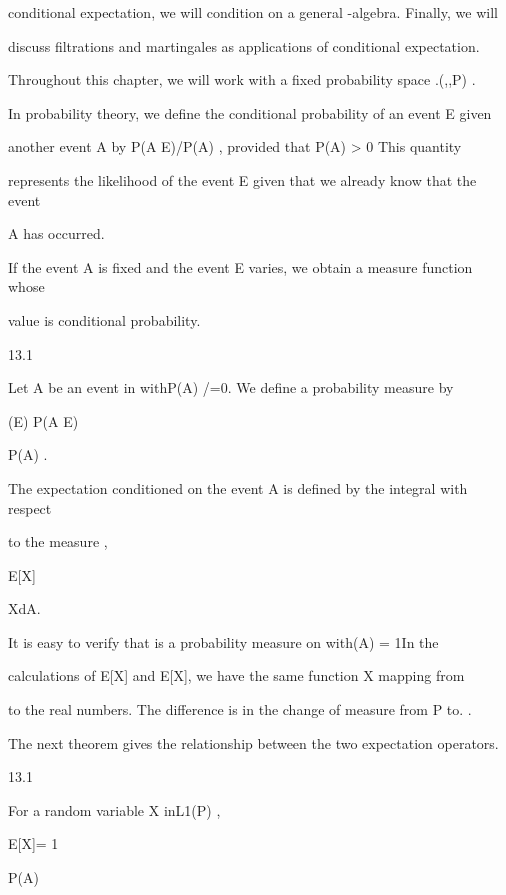 conditional expectation, we will condition on a general \sigma-algebra. Finally, we will

discuss filtrations and martingales as applications of conditional expectation.

Throughout this chapter, we will work with a fixed probability space .(\Omega,,P) .

In probability theory, we define the conditional probability of an event E given

another event A by P(A \cap E)/P(A) , provided that P(A) > 0 This quantity

represents the likelihood of the event E given that we already know that the event

A has occurred.

If the event A is fixed and the event E varies, we obtain a measure function whose

value is conditional probability.

\begin{defbox}{13.1}
\end{defbox}

Let A be an event in withP(A) /=0. We define a probability measure \muA by

\muA(E) \coloneqq P(A \cap E)

P(A) .

The expectation conditioned on the event A is defined by the integral with respect

to the measure \muA,

E[X\vertA] \coloneqq

\int

\Omega

Xd\mu A.

It is easy to verify that \muA is a probability measure on with\muA(A) = 1In the

calculations of E[X] and E[X\vertA], we have the same function X mapping from \Omega

to the real numbers. The difference is in the change of measure from P to. \muA.

The next theorem gives the relationship between the two expectation operators.

\begin{thmbox}{13.1}
\end{thmbox}

For a random variable X inL1(P) ,

E[X\vertA]= 1

P(A)

